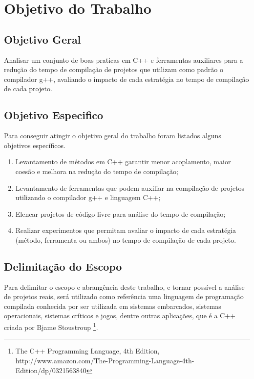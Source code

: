 \section{Objetivo do Trabalho}

\subsection{Objetivo Geral}

Analisar um conjunto de boas praticas em C++ e ferramentas auxiliares
 para a redução do tempo de compilação de projetos que utilizam como
 padrão o compilador g++, avaliando o impacto de cada estratégia no
 tempo de compilação de cada projeto.

\subsection{Objetivo Especifico}

Para conseguir atingir o objetivo geral do trabalho foram listados
 alguns objetivos específicos.


\begin{enumerate}
    \item Levantamento de  métodos em C++ garantir menor acoplamento,
 maior coesão e melhora na redução do tempo de compilação;
    \item Levantamento de ferramentas que podem auxiliar na compilação
 de projetos utilizando o compilador g++ e linguagem C++;
    \item Elencar projetos de código livre para análise do tempo de
 compilação;
    \item Realizar experimentos que permitam avaliar o impacto de cada
 estratégia (método, ferramenta ou ambos) no tempo de compilação de
 cada projeto.
\end{enumerate}

\subsection{Delimitação do Escopo}

Para delimitar o escopo e abrangência deste trabalho, e tornar possível
 a análise de projetos reais, será utilizado como referência uma linguagem
 de programação compilada conhecida por ser utilizada em sistemas embarcados,
 sistemas operacionais, sistemas críticos e jogos, dentre outras aplicações,
 que é a  C++ criada por Bjame Stoustroup \footnote{The C++ Programming Language, 4th Edition, http://www.amazon.com/The-Programming-Language-4th-Edition/dp/0321563840}.

